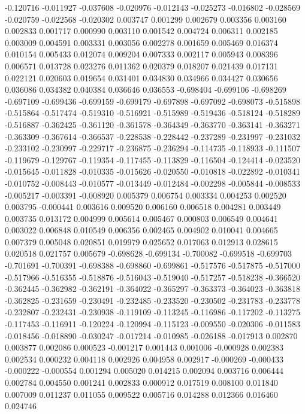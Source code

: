 -0.120716
-0.011927
-0.037608
-0.020976
-0.012143
-0.025273
-0.016802
-0.028569
-0.020759
-0.022568
-0.020302
0.003747
0.001299
0.002679
0.003356
0.003160
0.002833
0.001717
0.000990
0.003110
0.001542
0.004724
0.006311
0.002185
0.003009
0.004591
0.003331
0.003056
0.002278
0.001659
0.005469
0.016374
0.010154
0.005433
0.012074
0.009204
0.007333
0.002117
0.005943
0.008396
0.006571
0.013728
0.023276
0.011362
0.020379
0.018207
0.021439
0.017131
0.022121
0.020603
0.019654
0.031401
0.034830
0.034966
0.034427
0.030656
0.036086
0.034382
0.040384
0.036646
0.036553
-0.698404
-0.699106
-0.698269
-0.697109
-0.699436
-0.699159
-0.699179
-0.697898
-0.697092
-0.698073
-0.515898
-0.515864
-0.517474
-0.519310
-0.516921
-0.515989
-0.519436
-0.518124
-0.518289
-0.516887
-0.362425
-0.361120
-0.361578
-0.364349
-0.363770
-0.363141
-0.363271
-0.363309
-0.367614
-0.366537
-0.228538
-0.228442
-0.237289
-0.231997
-0.231032
-0.233102
-0.230997
-0.229717
-0.236875
-0.236294
-0.114735
-0.118933
-0.111507
-0.119679
-0.129767
-0.119354
-0.117455
-0.113829
-0.116504
-0.124414
-0.023520
-0.015645
-0.011828
-0.010335
-0.015626
-0.020550
-0.010818
-0.022892
-0.010341
-0.010752
-0.008443
-0.010577
-0.013449
-0.012484
-0.002298
-0.005844
-0.008533
-0.005217
-0.003391
-0.008920
0.005379
0.006754
0.003334
0.004253
0.002520
0.003795
-0.000441
0.003616
0.009520
0.006160
0.006518
0.004281
0.003449
0.003735
0.013172
0.004999
0.005614
0.005467
0.000803
0.006549
0.004641
0.003022
0.006848
0.010549
0.006356
0.002465
0.004902
0.010041
0.004665
0.007379
0.005048
0.020851
0.019979
0.025652
0.017063
0.012913
0.028615
0.020518
0.021757
0.005679
-0.698628
-0.699134
-0.700082
-0.699518
-0.699703
-0.701691
-0.700391
-0.698388
-0.698860
-0.699861
-0.517576
-0.517875
-0.517000
-0.517966
-0.516355
-0.518876
-0.516043
-0.519040
-0.517257
-0.518238
-0.366520
-0.362445
-0.362982
-0.362191
-0.364022
-0.365297
-0.363373
-0.364023
-0.363818
-0.362825
-0.231659
-0.230491
-0.232485
-0.233520
-0.230502
-0.231783
-0.233778
-0.232807
-0.232431
-0.230938
-0.119109
-0.113245
-0.116986
-0.117202
-0.113275
-0.117453
-0.116911
-0.120224
-0.120994
-0.115123
-0.009550
-0.020306
-0.011583
-0.018456
-0.018890
-0.030247
-0.017214
-0.010985
-0.026188
-0.017913
0.002870
0.003877
0.002086
0.000523
-0.001217
0.001443
0.001006
-0.000928
0.002383
0.002534
0.000232
0.004118
0.002926
0.004958
0.002917
-0.000269
-0.000433
-0.000222
-0.000554
0.001294
0.005020
0.014215
0.002094
0.003716
0.006444
0.002784
0.004550
0.001241
0.002833
0.000912
0.017519
0.008100
0.011840
0.007009
0.011237
0.011055
0.009522
0.005716
0.014288
0.012366
0.016460
0.024746
